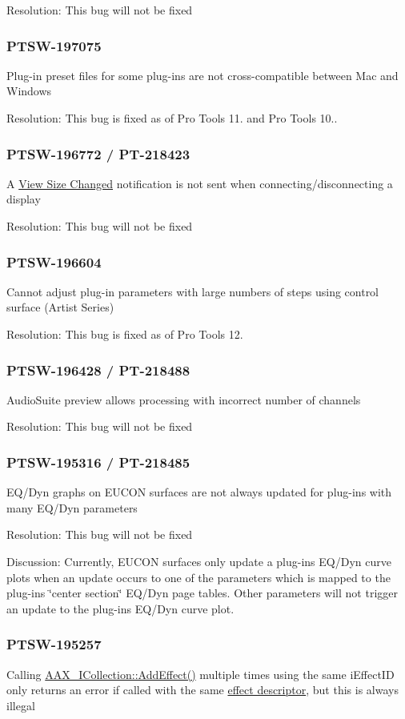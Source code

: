 Resolution\+: This bug will not be fixed\hypertarget{a00374_PTSW-197075}{}\subsubsection{P\+T\+S\+W-\/197075}\label{a00374_PTSW-197075}
Plug-\/in preset files for some plug-\/ins are not cross-\/compatible between Mac and Windows

Resolution\+: This bug is fixed as of Pro Tools 11. and Pro Tools 10..\hypertarget{a00374_PTSW-196772}{}\subsubsection{P\+T\+S\+W-\/196772 / P\+T-\/218423}\label{a00374_PTSW-196772}
A \hyperlink{a00206_afab5ea2cfd731fc8f163b6caa685406ea74ab285136093261fd246572659f119c}{View Size Changed} notification is not sent when connecting/disconnecting a display

Resolution\+: This bug will not be fixed\hypertarget{a00374_PTSW-196604}{}\subsubsection{P\+T\+S\+W-\/196604}\label{a00374_PTSW-196604}
Cannot adjust plug-\/in parameters with large numbers of steps using control surface (Artist Series)

Resolution\+: This bug is fixed as of Pro Tools 12.\hypertarget{a00374_PTSW-196428}{}\subsubsection{P\+T\+S\+W-\/196428 / P\+T-\/218488}\label{a00374_PTSW-196428}
Audio\+Suite preview allows processing with incorrect number of channels

Resolution\+: This bug will not be fixed\hypertarget{a00374_PTSW-195316}{}\subsubsection{P\+T\+S\+W-\/195316 / P\+T-\/218485}\label{a00374_PTSW-195316}
E\+Q/\+Dyn graphs on E\+U\+C\+O\+N surfaces are not always updated for plug-\/ins with many E\+Q/\+Dyn parameters

Resolution\+: This bug will not be fixed

Discussion\+: Currently, E\+U\+C\+O\+N surfaces only update a plug-\/in\textquotesingle{}s E\+Q/\+Dyn curve plots when an update occurs to one of the parameters which is mapped to the plug-\/in\textquotesingle{}s \char`\"{}center section\char`\"{} E\+Q/\+Dyn page tables. Other parameters will not trigger an update to the plug-\/in\textquotesingle{}s E\+Q/\+Dyn curve plot.\hypertarget{a00374_PTSW-195257}{}\subsubsection{P\+T\+S\+W-\/195257}\label{a00374_PTSW-195257}
Calling \hyperlink{a00087_a5ff114b8c4da2081515186f2faf65c8c}{A\+A\+X\+\_\+\+I\+Collection\+::\+Add\+Effect()} multiple times using the same {\ttfamily i\+Effect\+I\+D} only returns an error if called with the same \hyperlink{a00096}{effect descriptor}, but this is always illegal

